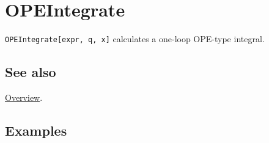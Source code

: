 \documentclass[../FeynCalcManual.tex]{subfiles}
\begin{document}
\hypertarget{opeintegrate}{
\section{OPEIntegrate}\label{opeintegrate}}

\texttt{OPEIntegrate[\allowbreak{}expr,\ \allowbreak{}q,\ \allowbreak{}x]}
calculates a one-loop OPE-type integral.

\subsection{See also}

\hyperlink{toc}{Overview}.

\subsection{Examples}
\end{document}
